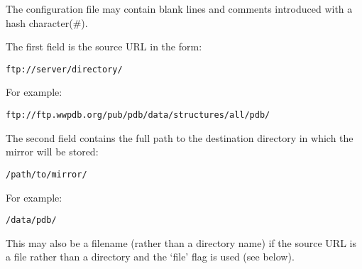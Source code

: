 \documentclass{article}
\begin{document}
The configuration file may contain blank lines and comments introduced
with a hash character(\#).
\vspace{2em}

The first field is the source URL in the form:
\begin{verbatim}
ftp://server/directory/
\end{verbatim}
For example:
\begin{verbatim}
ftp://ftp.wwpdb.org/pub/pdb/data/structures/all/pdb/
\end{verbatim}

The second field contains the full path to the destination directory
in which the mirror will be stored:
\begin{verbatim}
/path/to/mirror/
\end{verbatim}
For example:
\begin{verbatim}
/data/pdb/
\end{verbatim}
This may also be a filename (rather than a directory name) if the
source URL is a file rather than a directory and the `file' flag is
used (see below).
\end{document}
